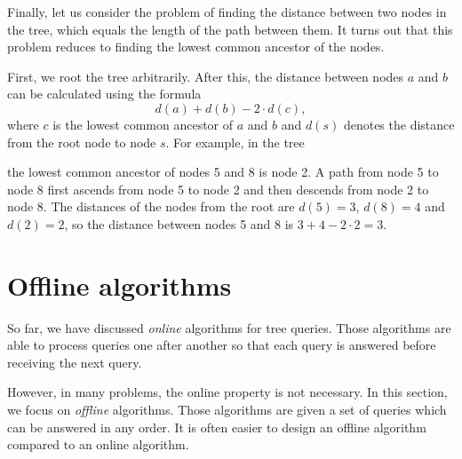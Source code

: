 Finally, let us consider the problem of
finding the distance between
two nodes in the tree, which equals
the length of the path between them.
It turns out that this problem reduces to
finding the lowest common ancestor of the nodes.

First, we root the tree arbitrarily.
After this, the distance between nodes $a$ and $b$
can be calculated using the formula
\[d(a)+d(b)-2 \cdot d(c),\]
where $c$ is the lowest common ancestor of $a$ and $b$
and $d(s)$ denotes the distance from the root node
to node $s$.
For example, in the tree

\begin{center}
\end{center}
the lowest common ancestor of nodes 5 and 8 is node 2.
A path from node 5 to node 8
first ascends from node 5 to node 2
and then descends from node 2 to node 8.
The distances of the nodes from the root are
$d(5)=3$, $d(8)=4$ and $d(2)=2$,
so the distance between nodes 5 and 8 is
$3+4-2\cdot2=3$.

\section{Offline algorithms}

So far, we have discussed \emph{online} algorithms
for tree queries.
Those algorithms are able to process
queries one after another so that
each query is answered before receiving the next query.

However, in many problems, the online
property is not necessary.
In this section, we focus on \emph{offline} algorithms.
Those algorithms are given a set of queries which can
be answered in any order.
It is often easier to design an offline algorithm
compared to an online algorithm.


